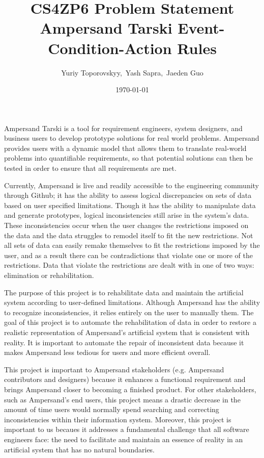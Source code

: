 \documentclass[12pt]{article}
\begin{document}
\title{CS4ZP6 Problem Statement \\ Ampersand Tarski Event-Condition-Action 
Rules \\ \vspace{-1ex}} 
\author{\normalsize{Yuriy Toporovskyy,\ Yash Sapra,\ Jaeden Guo}}
\date{\normalsize\today}
\thispagestyle{empty}
\maketitle

Ampersand Tarski is a tool for requirement engineers, system designers, and 
business users to develop prototype solutions for real world problems. 
Ampersand provides users with a dynamic model that allows them to translate 
real-world problems into quantifiable requirements, so that potential solutions 
can then be tested in order to ensure that all requirements are met.

Currently, Ampersand is live and readily accessible to the engineering 
community through Github; it has the ability to assess logical discrepancies on 
sets of data based on user specified limitations. Though it has the ability to 
manipulate data and generate prototypes, logical inconsistencies still arise in 
the system’s data. These inconsistencies occur when the user changes the 
restrictions imposed on the data and the data struggles to remodel itself to 
fit the new restrictions. Not all sets of data can easily remake themselves to 
fit the restrictions imposed by the user, and as a result there can be 
contradictions that violate one or more of the restrictions. Data that violate 
the restrictions are dealt with in one of two ways: elimination or 
rehabilitation.

The purpose of this project is to rehabilitate data and maintain the artificial 
system according to user-defined limitations. Although Ampersand has the 
ability to recognize inconsistencies, it relies entirely on the user to 
manually them. The goal of this project is to automate the 
rehabilitation of data in order to restore a realistic representation of 
Ampersand's artificial system that is consistent with reality. It is important 
to automate the repair of inconsistent data because it makes Ampersand less 
tedious for users and more efficient overall.

This project is important to Ampersand stakeholders (e.g. Ampersand 
contributors and designers) because it enhances a functional requirement and 
brings Ampersand closer to becoming a finished product. For other stakeholders, 
such as Ampersand's end users, this project means a drastic decrease in the 
amount of time users would normally spend searching and correcting 
inconsistencies within their information system.  Moreover, this project is 
important to us becaues it addresses a fundamental challenge that all software 
engineers face: the need to facilitate and maintain an essence of reality in an 
artificial system that has no natural boundaries.
\end{document}
